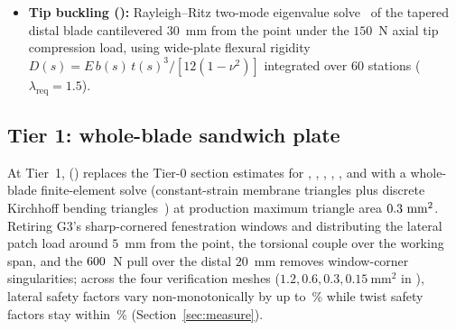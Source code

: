 \begin{itemize}
faces~\cite{benedetti2018,johnsen2024,nicoletto2018}. The yield-sequence ratio
$\mathrm{seq} = \min_{c \in \{\text{lat, twist, pull}\}} \mathrm{SF}_\mathrm{hand}(c)/\mathrm{SF}_\mathrm{blade}(c)$ is
evaluated per load case separately (, target $\ge 1.2$).
\item \textbf{Tip buckling ():} Rayleigh--Ritz two-mode eigenvalue solve~\cite{timoshenko1961} of the tapered
distal blade cantilevered $30$~mm from the point under the $150$~N axial tip compression load, using wide-plate flexural
rigidity $D(s) = E\,b(s)\,t(s)^3 / [12(1 - \nu^2)]$ integrated over 60 stations ($\lambda_\mathrm{req} = 1.5$).
\end{itemize}

\subsection{Tier 1: whole-blade sandwich plate}
At Tier~1,  () replaces the Tier-0 section estimates
for , , , , , and 
with a whole-blade  finite-element solve (constant-strain membrane triangles plus discrete Kirchhoff
bending triangles~\cite{batoz1980}) at production maximum triangle area $0.3~\mathrm{mm^2}$. Retiring G3's sharp-cornered fenestration
windows and distributing the lateral patch load around $5$~mm from the point, the torsional couple over the working span, and
the $600$~N pull over the distal $20$~mm removes window-corner singularities; across the four verification meshes
($1.2, 0.6, 0.3, 0.15~\mathrm{mm^2}$ in ), lateral safety factors vary non-monotonically by up to
\gVvPlateLatSpreadPct\,\% while twist safety factors stay within \gVvPlateTwistSpreadPct\,\% (Section~\ref{sec:measure}).


